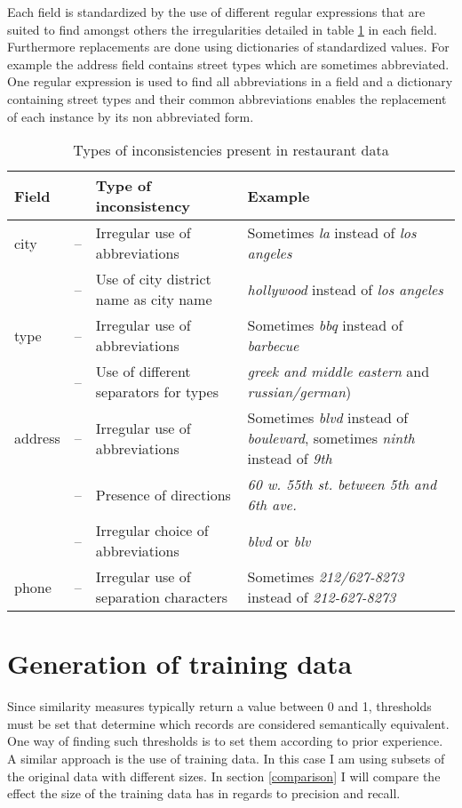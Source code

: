 \documentclass[conference]{IEEEtran}
\begin{document}
Each field is standardized by the use of different regular expressions that are suited to find amongst others the irregularities detailed in table \ref{rec_faults} in each field. Furthermore replacements are done using dictionaries of standardized values. For example the address field contains street types which are sometimes abbreviated. One regular expression is used to find all abbreviations in a field and a dictionary containing street types and their common abbreviations enables the replacement of each instance by its non abbreviated form.
\begin{table}
	\begin{tabularx}{\columnwidth}{lr@{ }XX}
	\toprule
	Field &&Type of inconsistency & Example \\
	\midrule
	city & --&Irregular use of abbreviations &Sometimes \emph{la} instead of \emph{los angeles}\\\rule[.2ex]{0pt}{2.5ex}
		 & --&Use of city district name as city name& \emph{hollywood} instead of \emph{los angeles}\\
	\midrule
	type & --& Irregular use of abbreviations  &Sometimes \emph{bbq} instead of \emph{barbecue}\\\rule[.2ex]{0pt}{2.5ex}
		 & --& Use of different separators for types & \emph{greek and middle eastern} and \emph{russian/german})\\
	\midrule
	address & --&Irregular use of abbreviations &Sometimes \emph{blvd} instead of \emph{boulevard}, sometimes \emph{ninth} instead of \emph{9th}\\\rule[.2ex]{0pt}{2.5ex}
	 & --&Presence of directions & \emph{60 w. 55th st. between 5th and 6th ave.}\\\rule[.2ex]{0pt}{2.5ex}
	 & --& Irregular choice of abbreviations & \emph{blvd} or \emph{blv}\\
	\midrule
	phone & --& Irregular use of separation characters  & Sometimes \emph{212/627-8273} instead of \emph{212-627-8273}\\
	\bottomrule
	\end{tabularx}
	\caption{Types of inconsistencies present in restaurant data}\label{rec_faults}
\end{table}

\section{Generation of training data}\label{train_gen}
Since similarity measures typically return a value between 0 and 1, thresholds must be set that determine which records are considered semantically equivalent. One way of finding such thresholds is to set them according to prior experience. A similar approach is the use of training data. In this case I am using subsets of the original data with different sizes. In section \ref{comparison} I will compare the effect the size of the training data has in regards to precision and recall. 
\end{document}

